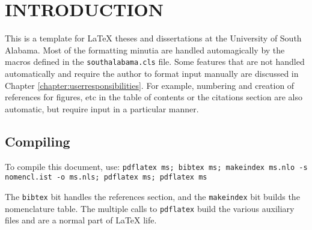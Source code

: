 
\chapter{INTRODUCTION} \label{chapter:intro}

This is a template for LaTeX theses and dissertations at the University of South Alabama.
 Most of the formatting minutia are handled automagically by the macros defined in the \texttt{southalabama.cls} file.
 Some features that are not handled automatically and require the author to format input manually are discussed in Chapter \ref{chapter:userresponsibilities}.
 For example, numbering and creation of references for figures, etc in the table of contents or the citations section are also automatic, but require input in a particular manner.

\section{Compiling}

To compile this document, use: \texttt{pdflatex ms; bibtex ms; makeindex ms.nlo -s nomencl.ist -o ms.nls; pdflatex ms; pdflatex ms}

The \texttt{bibtex} bit handles the references section, and the \texttt{makeindex} bit builds the nomenclature table.
 The multiple calls to \texttt{pdflatex} build the various auxiliary files and are a normal part of LaTeX life.
